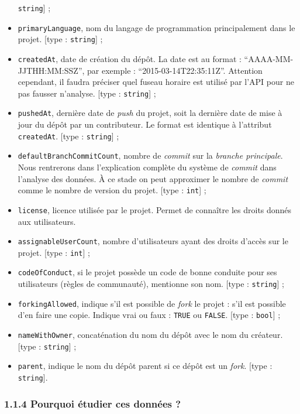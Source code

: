 \documentclass[
]{article}
\begin{document}
\begin{itemize}
  \texttt{string}{]} ;
\item
  \texttt{primaryLanguage}, nom du langage de programmation
  principalement dans le projet. {[}type : \texttt{string}{]} ;
\item
  \texttt{createdAt}, date de création du dépôt. La date est au format :
  ``AAAA-MM-JJTHH:MM:SSZ'', par exemple : ``2015-03-14T22:35:11Z''.
  Attention cependant, il faudra préciser quel fuseau horaire est
  utilisé par l'API pour ne pas fausser n'analyse. {[}type :
  \texttt{string}{]} ;
\item
  \texttt{pushedAt}, dernière date de \emph{push} du projet, soit la
  dernière date de mise à jour du dépôt par un contributeur. Le format
  est identique à l'attribut \texttt{createdAt}. {[}type :
  \texttt{string}{]} ;
\item
  \texttt{defaultBranchCommitCount}, nombre de \emph{commit} sur la
  \emph{branche principale}. Nous rentrerons dans l'explication complète
  du système de \emph{commit} dans l'analyse des données. À ce stade on
  peut approximer le nombre de \emph{commit} comme le nombre de version
  du projet. {[}type : \texttt{int}{]} ;
\item
  \texttt{license}, licence utilisée par le projet. Permet de connaître
  les droits donnés aux utilisateurs.
\item
  \texttt{assignableUserCount}, nombre d'utilisateurs ayant des droits
  d'accès sur le projet. {[}type : \texttt{int}{]} ;
\item
  \texttt{codeOfConduct}, si le projet possède un code de bonne conduite
  pour ses utilisateurs (règles de communauté), mentionne son nom.
  {[}type : \texttt{string}{]} ;
\item
  \texttt{forkingAllowed}, indique s'il est possible de \emph{fork} le
  projet : s'il est possible d'en faire une copie. Indique vrai ou faux
  : \texttt{TRUE} ou \texttt{FALSE}. {[}type : \texttt{bool}{]} ;
\item
  \texttt{nameWithOwner}, concaténation du nom du dépôt avec le nom du
  créateur. {[}type : \texttt{string}{]} ;
\item
  \texttt{parent}, indique le nom du dépôt parent si ce dépôt est un
  \emph{fork}. {[}type : \texttt{string}{]}.
\end{itemize}

\subsubsection{1.1.4 Pourquoi étudier ces données
?}\label{pourquoi-uxe9tudier-ces-donnuxe9es}
\end{document}
